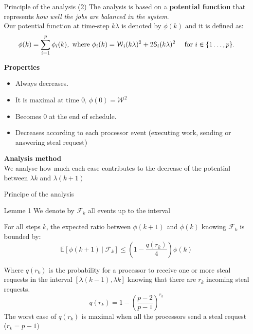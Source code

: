 \documentclass{beamer}
\begin{document}
\begin{frame}{Principle of the analysis (2)}
    The analysis is based on a \textbf{potential function} that represents \textit{how well the jobs are balanced in the system}.\\

    Our potential function at time-step $k\lambda$ is denoted by $\phi(k)$ and it is defined as:
    \begin{equation*}
        \phi(k) = \sum_{i=1}^{p} \phi_i(k),  
        \text{ where $\phi_i(k) =
         \mathcal{W}_{i}(k\lambda)^{2} + 2\mathcal{S}_{i}(k\lambda)^{2}$ \quad for $i\in\{1\dots,p\}$}. 
    \end{equation*}
    \bigskip
    
    \textbf{Properties}
    \begin{itemize}
        \item Always decreases. 
        \item It is maximal at time 0, $\phi(0)= \mathcal{W}^2$
        \item Becomes $0$ at the end of schedule. 
        \item Decreases according to each processor event (executing work, sending or answering steal request) 
    \end{itemize}
    
    \textbf{Analysis method}\\

    \alert{ We analyse how much each case contributes to the decrease of the potential between \alert{$\lambda k$} and \alert{$\lambda(k+1)$}}

\end{frame}
\begin{frame}{Principe of the analysis}

\begin{alertblock}{Lemme 1}
        We denote by $\mathcal{F}_{k}$ all events up to the interval

        For all steps $k$, the expected ratio between $\phi(k+1)$ and $\phi(k)$ knowing $\mathcal{F}_{k}$ is bounded by: 
        \begin{equation*}
            \mathbb{E}[\phi(k+1) \:|\: \mathcal{F}_{k}] \leq \left(1-\frac{q(r_k)}{4}\right)\phi(k) 
            \label{expdiff}
        \end{equation*}


        Where $q(r_k)$ is the probability for a processor to receive one
        or more steal requests in the interval $[\lambda(k-1),\lambda k]$ knowing that there are $r_k$ incoming steal requests.
        \begin{equation*}
            q(r_k) = 1 - \left(\frac{p-2}{p-1}\right)^{r_k}
            \label{expdiff}
        \end{equation*}
        The worst case of $q(r_k)$ is maximal when all the processors send a steal request ($r_k=p-1$)
        
        \end{alertblock}
\end{frame}
\end{document}
